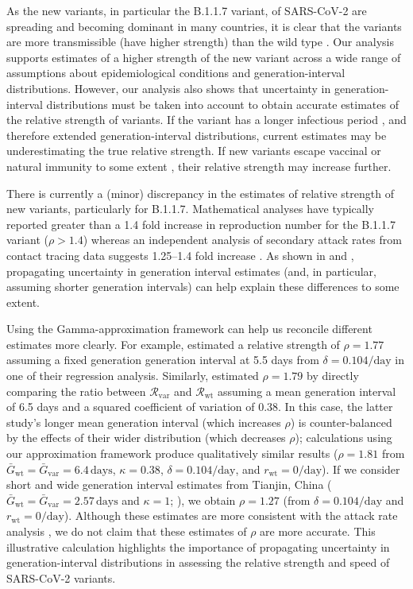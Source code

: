 \documentclass[12pt]{article}
\newcommand{\vvvar}{\mathrm{var}}
\newcommand{\wwwt}{\mathrm{wt}}
\newcommand{\rx}[1]{\ensuremath{{r}_{#1}}\xspace}
\newcommand{\rw}{\rx{\wwwt}}
\newcommand{\Rx}[1]{\ensuremath{{\mathcal R}_{#1}}\xspace}
\newcommand{\Rw}{\Rx{\wwwt}}
\newcommand{\Rv}{\Rx{\vvvar}}
\newcommand{\days}{\ensuremath{\, \textrm{days}}}
\newcommand{\pday}{\ensuremath{/\textrm{day}}}
\newcommand{\Gx}[1]{\ensuremath{{\bar G}_{#1}}\xspace}
\newcommand{\Gw}{\Gx{\wwwt}}
\newcommand{\Gv}{\Gx{\vvvar}}
\begin{document}
As the new variants, in particular the B.1.1.7 variant, of SARS-CoV-2 are spreading and becoming dominant in many countries, it is clear that the variants are more transmissible (have higher strength) than the wild type \citep{switzerland2021variant, davies2021estimated, di2021impact, leung2021early, volz2021transmission,zhao2021}.
Our analysis supports estimates of a higher strength of the new variant across a wide range of assumptions about epidemiological conditions and generation-interval distributions.
However, our analysis also shows that uncertainty in generation-interval distributions must be taken into account to obtain accurate estimates of the relative strength of variants.
If the variant has a longer infectious period \citep{kissler2021densely}, and therefore extended generation-interval distributions, current estimates may be underestimating the true relative strength.
If new variants escape vaccinal or natural immunity to some extent \citep{shaman2020will}, their relative strength may increase further.

There is currently a (minor) discrepancy in the estimates of relative strength of new variants, particularly for B.1.1.7.
Mathematical analyses have typically reported greater than a 1.4 fold increase in reproduction number for the B.1.1.7 variant ($\rho > 1.4$) whereas an independent analysis of secondary attack rates from contact tracing data suggests 1.25--1.4 fold increase \citep{ukinvest}.
As shown in \cite{davies2021estimated} and \cite{volz2021transmission}, propagating uncertainty in generation interval estimates (and, in particular, assuming shorter generation intervals) can help explain these differences to some extent.

Using the Gamma-approximation framework \citep{doi:10.1098/rsif.2020.0144} can help us reconcile different estimates more clearly.
For example, \cite{davies2021estimated} estimated a relative strength of $\rho=1.77$ assuming a fixed generation generation interval at 5.5 days from $\delta=0.104\pday$ in one of their regression analysis.
Similarly, \cite{volz2021transmission} estimated $\rho=1.79$ by directly comparing the ratio between $\Rv$ and $\Rw$ assuming a mean generation interval of 6.5 days and a squared coefficient of variation of 0.38.
In this case, the latter study's longer mean generation interval (which increases $\rho$) is counter-balanced by the effects of their wider distribution (which decreases $\rho$); calculations using our approximation framework produce qualitatively similar results ($\rho=1.81$ from $\Gw=\Gv=6.4\days$, $\kappa=0.38$, $\delta=0.104\pday$, and $\rw=0\pday$).
If we consider short and wide generation interval estimates from Tianjin, China ($\Gw=\Gv=2.57\days$ and $\kappa=1$; \cite{ganyani2020estimating}), we obtain $\rho=1.27$ (from $\delta=0.104\pday$ and $\rw = 0\pday$).
Although these estimates are more consistent with the attack rate analysis \citep{ukinvest},
we do not claim that these estimates of $\rho$ are more accurate.
This illustrative calculation highlights the importance of propagating uncertainty in generation-interval distributions in assessing the relative strength and speed of SARS-CoV-2 variants.
\end{document}
